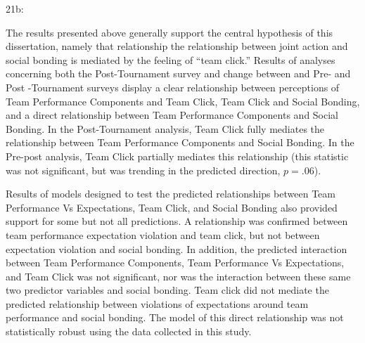 \begin{CJK}{UTF8}{gbsn}



21b: %


  The results presented above generally support the central hypothesis of this dissertation, namely that relationship the relationship between joint action and social bonding is mediated by the feeling of ``team click.''  Results of analyses concerning both the Post-Tournament survey and change between and Pre- and Post -Tournament surveys display a clear relationship between perceptions of Team Performance Components and Team Click, Team Click and Social Bonding, and a direct relationship between Team Performance Components and Social Bonding.  In the Post-Tournament analysis, Team Click fully mediates the relationship between Team Performance Components and Social Bonding. In the Pre-post analysis, Team Click partially mediates this relationship (this statistic was not significant, but was trending in the predicted direction, $p = .06$).

  Results of models designed to test the predicted relationships between Team Performance Vs Expectations, Team Click, and Social Bonding also provided support for some but not all predictions. A relationship was confirmed between team performance expectation violation and team click, but not between expectation violation and social bonding. In addition, the predicted interaction between Team Performance Components, Team Performance Vs Expectations, and Team Click was not significant, nor was the interaction between these same two predictor variables and social bonding.  Team click did not mediate the predicted relationship between violations of expectations around team performance and social bonding. The model of this direct relationship was not statistically robust using the data collected in this study.


\end{CJK}
